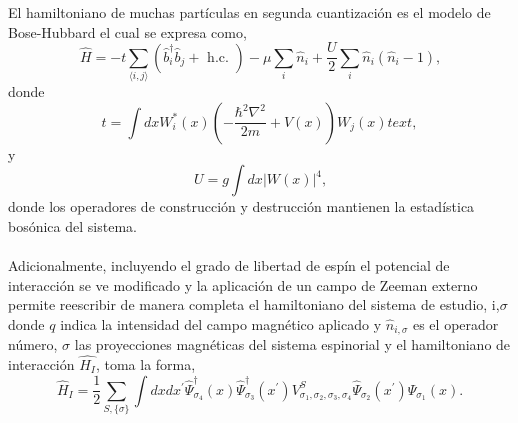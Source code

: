 El hamiltoniano de muchas partículas en segunda cuantización es el modelo de Bose-Hubbard el cual se expresa como,
\begin{equation}
    \hat{H}=-t \sum_{\langle i, j\rangle}\left(\hat{b}_i^{\dagger} \hat{b}_j+\text { h.c. }\right)-\mu \sum_i \hat{n}_i+\frac{U}{2} \sum_i \hat{n}_i\left(\hat{n}_i-1\right) \text {,}
\end{equation}
donde
\begin{equation}
    t=\int d x W_i^*(x)\left(-\frac{\hbar^2 \nabla^2}{2 m}+V(x)\right) W_j(x) text {,}
\end{equation}
y 
\begin{equation}
    U=g \int d x|W(x)|^4 \text {,}
\end{equation}
donde los operadores de construcción y destrucción mantienen la estadística bosónica del sistema. \\ \\
Adicionalmente, incluyendo el grado de libertad de espín el potencial de interacción se ve modificado y la aplicación de un campo de Zeeman externo permite reescribir de manera completa el hamiltoniano del sistema de estudio,
i,$\sigma$
donde $q$ indica la intensidad del campo magnético aplicado y $\hat{n}_{i, \sigma}$ es el operador número, $\sigma$ las proyecciones magnéticas del sistema espinorial y el hamiltoniano de interacción $\hat{H_I}$, toma la forma,
\begin{equation}
\hat{H}_I=\frac{1}{2} \sum_{S,\{\sigma\}} \int d x d x^{\prime} \hat{\Psi}_{\sigma_4}^{\dagger}(x) \hat{\Psi}_{\sigma_3}^{\dagger}\left(x^{\prime}\right) V_{\sigma_1, \sigma_2, \sigma_3, \sigma_4}^S \hat{\Psi}_{\sigma_2}\left(x^{\prime}\right) \hat{\Psi}_{\sigma_1}(x) \text{.}
\end{equation}
